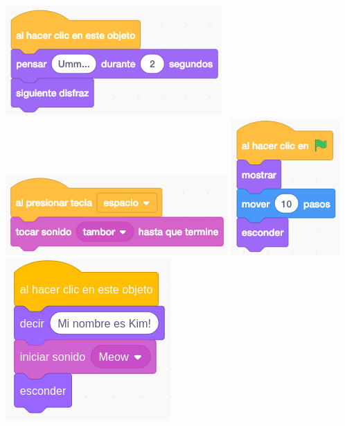 \documentclass[letterpaper,12pt]{article}
\begin{document}
\includegraphics[scale=.5,valign=t]{q3_script0.png} \hspace{.1cm}
\includegraphics[scale=.5,valign=t]{q3_script1.png} \hspace{.1cm}
\includegraphics[scale=.5,valign=t]{q3_script2.png} \hspace{.1cm}
\includegraphics[scale=.45,valign=t]{q3_script3.png} \hspace{.1cm}
\end{document}
